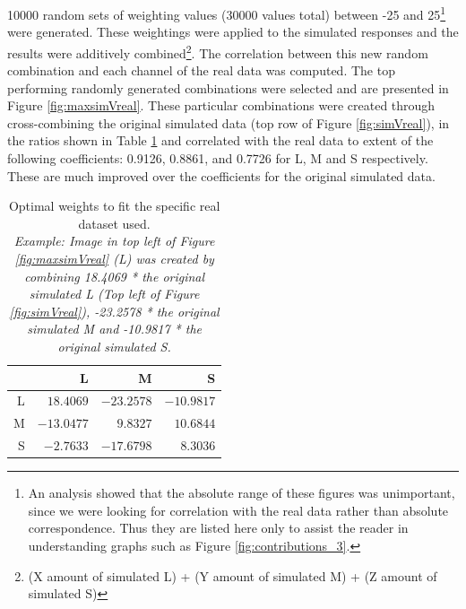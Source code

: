 10000 random sets of weighting values (30000 values total) between -25 and 25\footnote{An analysis showed that the absolute range of these figures was unimportant, since we were looking for correlation with the real data rather than absolute correspondence. Thus they are listed here only to assist the reader in understanding graphs such as Figure \ref{fig:contributions_3}.} were generated. These weightings were applied to the simulated responses and the results were additively combined\footnote{(X amount of simulated L) + (Y amount of simulated M) + (Z amount of simulated S)}. The correlation between this new random combination and each channel of the real data was computed. The top performing randomly generated combinations were selected and are presented in Figure \ref{fig:maxsimVreal}. These particular combinations were created through cross-combining the original simulated data (top row of Figure \ref{fig:simVreal}), in the ratios shown in Table \ref{tab:crosscomb} and correlated with the real data to extent of the following coefficients: 0.9126, 0.8861, and 0.7726 for L, M and S respectively. These are much improved over the coefficients for the original simulated data.


\begin{table}[hbtp]
\centering
\begin{tabular}{|r|r|r|r|}
\hline
 & L & M & S \\ \hline
L & $18.4069$ & $-23.2578$ & $-10.9817$ \\ \hline
M & $-13.0477$ & $9.8327$ & $10.6844$ \\ \hline
S & $-2.7633$ & $-17.6798$ & $8.3036$ \\ \hline
\end{tabular} %
\caption{Optimal weights to fit the specific real dataset used. \\ \emph{Example: Image in top left of Figure \ref{fig:maxsimVreal} (L) was created by combining 18.4069 * the original simulated L (Top left of Figure \ref{fig:simVreal}), -23.2578 * the original simulated M and -10.9817 * the original simulated S.}}
\label{tab:crosscomb}
\end{table}

